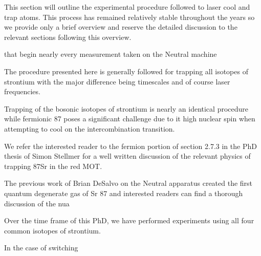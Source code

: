 This section will outline the experimental procedure followed to laser cool and trap atoms. This process has remained relatively stable throughout the years so we provide only a brief overview and reserve the detailed discussion to the relevant sections following this overview.

that begin nearly every measurement taken on the Neutral machine

 The procedure presented here is generally followed for trapping all isotopes of strontium with the major difference being timescales and of course laser frequencies.

Trapping of the bosonic isotopes of strontium is nearly an identical procedure while fermionic 87 poses a significant challenge due to it high nuclear spin when attempting to cool on the intercombination transition. 

We refer the interested reader to the fermion portion of section 2.7.3 in the PhD thesis of Simon Stellmer for a well written discussion of the relevant physics of trapping 87Sr in the red MOT.

The previous work of Brian DeSalvo on the Neutral apparatus created the first quantum degenerate gas of Sr 87 and interested readers can find a thorough discussion of the nua

Over the time frame of this PhD, we have performed experiments using all four common isotopes of strontium.

In the case of switching 



